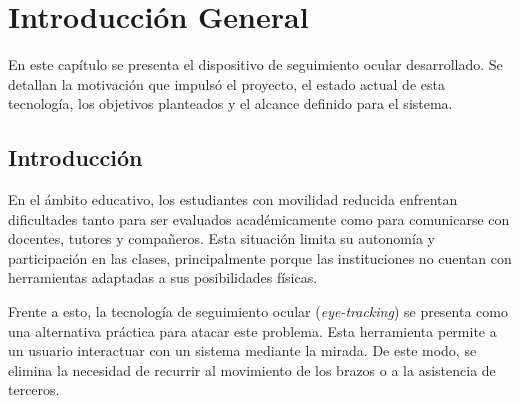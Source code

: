 
\chapter{Introducción General} %

\label{Chapter1} %
\label{IntroGeneral}

En este capítulo se presenta el dispositivo de seguimiento ocular desarrollado. Se detallan la motivación que impulsó el proyecto, el estado actual de esta tecnología, los objetivos planteados y el alcance definido para el sistema.


\newcommand{\keyword}[1]{\textbf{#1}}
\newcommand{\tabhead}[1]{\textbf{#1}}
\newcommand{\code}[1]{\texttt{#1}}
\newcommand{\file}[1]{\texttt{\bfseries#1}}
\newcommand{\option}[1]{\texttt{\itshape#1}}
\newcommand{\grados}{$^{\circ}$}



\section{Introducción}

En el ámbito educativo, los estudiantes con movilidad reducida enfrentan dificultades tanto para ser evaluados académicamente como para comunicarse con docentes, tutores y compañeros. Esta situación limita su autonomía y participación en las clases, principalmente porque las instituciones no cuentan con herramientas adaptadas a sus posibilidades físicas.

Frente a esto, la tecnología de seguimiento ocular (\emph{eye-tracking}) se presenta como una alternativa práctica para atacar este problema. Esta herramienta permite a un usuario interactuar con un sistema mediante la mirada. De este modo, se elimina la necesidad de recurrir al movimiento de los brazos o a la asistencia de terceros.


